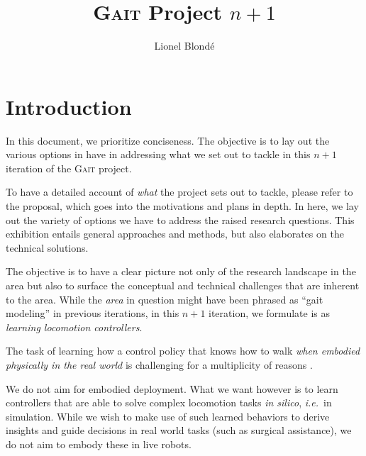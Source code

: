 \documentclass[12pt,a4paper]{article}
\title{\textsc{Gait} Project $n+1$}
\author{Lionel Blond\'e}
\begin{document}
\maketitle

\tableofcontents

\section{Introduction}
\label{s:intro}

In this document, we prioritize conciseness.
The objective is to lay out the various options in have in addressing what we set out to tackle
in this $n+1$ iteration of the \textsc{Gait} project.

To have a detailed account of \textit{what} the project sets out to tackle, please refer to the
proposal, which goes into the motivations and plans in depth.
In here, we lay out the variety of options we have to address the raised research questions.
This exhibition entails general approaches and methods, but also elaborates on the technical
solutions.

The objective is to have a clear picture not only of the research landscape in the area
but also to surface the conceptual and technical challenges that are inherent to the area.
While the \textit{area} in question might have been phrased as ``gait modeling'' in previous
iterations, in this $n+1$ iteration, we formulate is as
\emph{learning locomotion controllers}.

The task of learning how a control policy that knows how to walk \textit{when embodied physically
in the real world} is challenging for a multiplicity of reasons
\cite{Radosavovic2024-dm, Caluwaerts2023-ko, Yang2023-jr, Kaufmann2023-yc, Smith2022-sm}.

We do not aim for embodied deployment.
What we want however is to learn controllers that are able to solve complex locomotion tasks
\textit{in silico}, \textit{i.e.}~in simulation.
While we wish to make use of such learned behaviors to derive insights and guide decisions in real
world tasks (such as surgical assistance), we do not aim to embody these in live robots.
\end{document}
